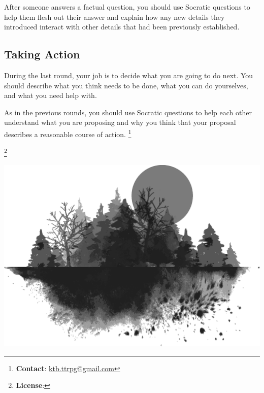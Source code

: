 \documentclass[a6paper, 11pt, parskip=half, DIV=15]{scrartcl}
\newcommand\blfootnote[1]{%
  \begingroup
  \renewcommand\thefootnote{}\footnote{#1}%
  \addtocounter{footnote}{-1}%
  \endgroup
}
\renewcommand{\thefootnote}{\fnsymbol{footnote}}
\begin{document}
After someone answers a factual question, you should use Socratic questions to help them flesh out their answer and explain how any new details they introduced interact with other details that had been previously established.

\newpage
\enlargethispage{1.75\baselineskip}

\subsection*{Taking Action}
During the last round, your job is to decide what you are going to do next.
You should describe what you think needs to be done, what you can do yourselves, and what you need help with.

As in the previous rounds, you should use Socratic questions to help each other understand what you are proposing and why you think that your proposal describes a reasonable course of action.
\blfootnote{\textbf{Contact}: \href{mailto:ktb.ttrpg@gmail.com}{ktb.ttrpg@gmail.com}}
\blfootnote{\textbf{License}: \raggedright\doclicenseLongText}

\vfill

\begin{center}
\includegraphics[scale=0.15]{Images/landscape.png}
\end{center}
\end{document}
